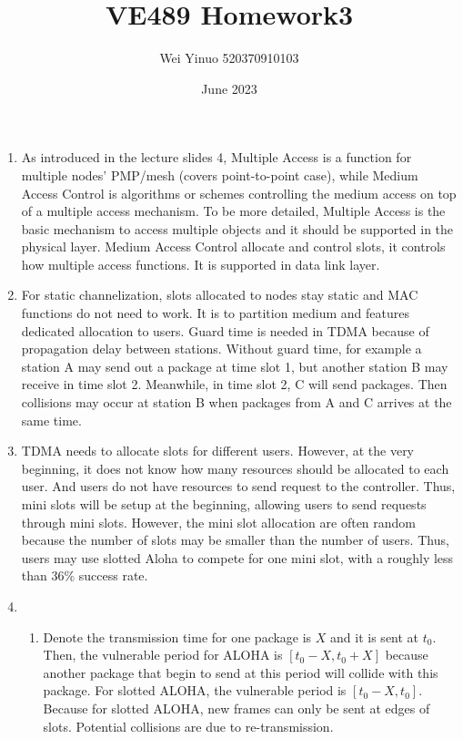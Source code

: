 \documentclass{article}
\title{VE489 Homework3}
\author{Wei Yinuo 520370910103}
\date{June 2023}
\begin{document}
\maketitle

\begin{enumerate}
    \item 
    As introduced in the lecture slides 4, Multiple Access is a function for multiple nodes’ PMP/mesh (covers point-to-point case), while Medium Access Control is algorithms or schemes controlling the medium access on top of a multiple access mechanism. 
    \newline To be more detailed, Multiple Access is the basic mechanism to access multiple objects and it should be supported in the physical layer. Medium Access Control allocate and control slots, it controls how multiple access functions. It is supported in data link layer.
    
    \item
    For static channelization, slots allocated to nodes stay static and MAC functions do not need to work. It is to partition medium and features dedicated allocation to users.
    \newline
    Guard time is needed in TDMA because of propagation delay between stations. Without guard time, for example a station A may send out a package at time slot 1, but another station B may receive in time slot 2. Meanwhile, in time slot 2, C will send packages. Then collisions may occur at station B when packages from A and C arrives at the same time.
    
    \item
    TDMA needs to allocate slots for different users. However, at the very beginning, it does not know how many resources should be allocated to each user. And users do not have resources to send request to the controller. Thus, mini slots will be setup at the beginning, allowing users to send requests through mini slots. However, the mini slot allocation are often random because the number of slots may be smaller than the number of users. Thus, users may use slotted Aloha to compete for one mini slot, with a roughly less than 36\% success rate.
    
    \item
    \begin{enumerate}
        \item Denote the transmission time for one package is $X$ and it is sent at $t_0$. Then, the vulnerable period for ALOHA is $[t_0-X, t_0+X]$ because another package that begin to send at this period will collide with this package.
        \newline For slotted ALOHA, the vulnerable period is $[t_0-X, t_0]$. Because for slotted ALOHA, new frames can only be sent at edges of slots. Potential collisions are due to re-transmission.
        

\end{enumerate}
\end{enumerate}
\end{document}
